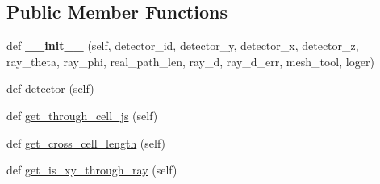 \subsection*{Public Member Functions}
\begin{DoxyCompactItemize}
\item 
\mbox{\label{classMIS_1_1Muon__Imaging__Algorithm_1_1InvDataTools_1_1calculate_1_1Rays_1_1Ray_a7f2380f201575b4e581d20622aa3f86e}} 
def {\bfseries \+\_\+\+\_\+init\+\_\+\+\_\+} (self, detector\+\_\+id, detector\+\_\+y, detector\+\_\+x, detector\+\_\+z, ray\+\_\+theta, ray\+\_\+phi, real\+\_\+path\+\_\+len, ray\+\_\+d, ray\+\_\+d\+\_\+err, mesh\+\_\+tool, loger)
\item 
def \hyperlink{classMIS_1_1Muon__Imaging__Algorithm_1_1InvDataTools_1_1calculate_1_1Rays_1_1Ray_ae8206727d85e726812d28509051589af}{detector} (self)
\item 
def \hyperlink{classMIS_1_1Muon__Imaging__Algorithm_1_1InvDataTools_1_1calculate_1_1Rays_1_1Ray_a1271cd5ea4ef6c0ce4cc3cbb7720cd6f}{get\+\_\+through\+\_\+cell\+\_\+js} (self)
\item 
def \hyperlink{classMIS_1_1Muon__Imaging__Algorithm_1_1InvDataTools_1_1calculate_1_1Rays_1_1Ray_a14b79d058530e57722199ba288a10927}{get\+\_\+cross\+\_\+cell\+\_\+length} (self)
\item 
def \hyperlink{classMIS_1_1Muon__Imaging__Algorithm_1_1InvDataTools_1_1calculate_1_1Rays_1_1Ray_a7727dae154d023b2bf7e17d28f59c9fd}{get\+\_\+is\+\_\+xy\+\_\+through\+\_\+ray} (self)
\end{DoxyCompactItemize}
